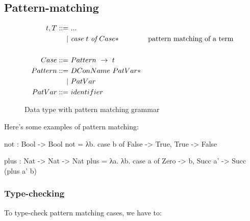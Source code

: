 \documentclass[
       embeddedlogo,
       english,
       lmodern,
       coorientadorbanca,
       noabntexcite
]{ufsc-thesis-rn46-2019}
\theoremstyle{definition}
\begin{document}
\subsection{Pattern-matching}

\begin{figure}[H]
       \[
              \begin{aligned}
                     t, T ::= & \ ... \\
                     |        & \ \emph{case}\ t\ \emph{of}\ Case* & \text{pattern matching of a term} \\
                     \\
                     Case      ::= & \ Pattern\ \rightarrow\ t \\
                     Pattern   ::= & \ DConName\ PatVar* \\
                     |             & \ PatVar   \\
                     PatVar    ::= & \ identifier
              \end{aligned}
       \]
       \caption{Data type with pattern matching grammar}
\end{figure}

Here's some examples of pattern matching:

\begin{piforall}
not : Bool -> Bool
not = λb. case b of {
  False -> True,
  True -> False
}

plus : Nat -> Nat -> Nat
plus = λa. λb. case a of {
  Zero -> b,
  Succ a' -> Succ (plus a' b)
}
\end{piforall}

\subsubsection{Type-checking}

To type-check pattern matching cases, we have to:
\end{document}
